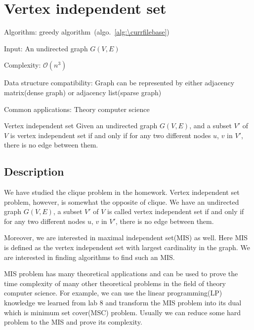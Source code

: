 \documentclass[catalog.tex]{subfiles}
\begin{document}
\def\pbname{Vertex independent set} %

\section{\pbname} 

\begin{overview}
\item [Algorithm:] greedy algorithm~(algo.~\ref{alg:\currfilebase}) 
\item [Input:] An undirected graph $G(V,E)$
\item [Complexity:] $\mathcal{O}(n^3)$
\item [Data structure compatibility:] Graph can be represented by either adjacency matrix(dense graph) or adjacency list(sparse graph)
\item [Common applications:] Theory computer science
\end{overview}


\begin{problem}{\pbname}
	Given an undirected graph $G(V,E)$, and a subset $V'$ of $V$ is vertex independent set if and only if for any two different nodes $u$, $v$ in $V'$, there is no edge between them. 
\end{problem}


\subsection*{Description}

We have studied the clique problem in the homework. Vertex independent set problem, however, is somewhat the opposite of clique. We have an undirected graph $G(V,E)$, a subset $V'$ of $V$ is called vertex independent set if and only if for any two different nodes $u$, $v$ in $V'$, there is no edge between them.  \newline

Moreover, we are interested in maximal independent set(MIS) as well. Here MIS is defined as the vertex independent set with largest cardinality in the graph. We are interested in finding algorithms to find such an MIS. \newline

MIS problem has many theoretical applications and can be used to prove the time complexity of many other theoretical problems in the field of theory computer science. For example, we can use the linear programming(LP) knowledge we learned from lab 8 and transform the MIS problem into its dual which is minimum set cover(MSC) problem. Usually we can reduce some hard problem to the MIS and prove its complexity. \newline
\end{document}
